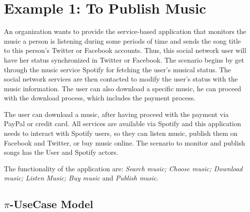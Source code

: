 



\section{Example 1: To Publish Music}
\label{sec:toPublishMusic_inpractice}

 
An organization wants to provide the service-based
 application that monitors the music a person is listening during some periods
 of time and sends the song title to this person's Twitter or Facebook accounts.
 Thus, this social network user will have her status synchronized in Twitter or
 Facebook. The scenario begins by get through the music service Spotify for
 fetching the user's musical status. The social network services are then
 contacted to modify the user's status with the music information. The user can
 also download a specific music, he can proceed with the download process, which
 includes the payment process. 

The user can download a music, after having proceed with the
 payment via PayPal or credit card. All services are available via Spotify and
 this application needs to interact with Spotify users, so they can listen
 music, publish them on Facebook and Twitter, or buy music online. The scenario
 to monitor and publish songs has the User and Spotify actors.

The functionality of the application are: \textit{Search music;
Choose music; Download music; Listen Music; Buy music} and \textit{Publish music}. 

 \subsection{$\pi$-UseCase Model}
\label{sec:usecase_topublishMusic}

